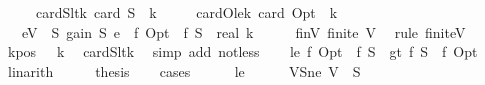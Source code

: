 \begin{isabellebody}
\ \ \ \ \ cardS{\isacharunderscore}{\kern0pt}lt{\isacharunderscore}{\kern0pt}k{\isacharcolon}{\kern0pt}\ {\isachardoublequoteopen}card\ S\ {\isacharless}{\kern0pt}\ k{\isachardoublequoteclose}\isanewline
\ \ \ \ \ cardO{\isacharunderscore}{\kern0pt}le{\isacharunderscore}{\kern0pt}k{\isacharcolon}{\kern0pt}\ {\isachardoublequoteopen}card\ Opt\ {\isasymle}\ k{\isachardoublequoteclose}\isanewline
\ \ \ {\isachardoublequoteopen}{\isasymexists}e{\isasymin}V\ {\isacharminus}{\kern0pt}\ S{\isachardot}{\kern0pt}\ gain\ S\ e\ {\isasymge}\ {\isacharparenleft}{\kern0pt}f\ Opt\ {\isacharminus}{\kern0pt}\ f\ S{\isacharparenright}{\kern0pt}\ {\isacharslash}{\kern0pt}\ real\ k{\isachardoublequoteclose}\isanewline
%
\isadelimproof
%
\endisadelimproof
%
\isatagproof
{}\isamarkupfalse%
\ {\isacharminus}{\kern0pt}\isanewline
\ \ \isamarkupfalse%
\ finV{\isacharcolon}{\kern0pt}\ {\isachardoublequoteopen}finite\ V{\isachardoublequoteclose}\ \isamarkupfalse%
\ {\isacharparenleft}{\kern0pt}rule\ finite{\isacharunderscore}{\kern0pt}V{\isacharparenright}{\kern0pt}\isanewline
\ \ \isamarkupfalse%
\ k{\isacharunderscore}{\kern0pt}pos{\isacharcolon}{\kern0pt}\ {\isachardoublequoteopen}{}\ {\isacharless}{\kern0pt}\ k{\isachardoublequoteclose}\ \isamarkupfalse%
\ cardS{\isacharunderscore}{\kern0pt}lt{\isacharunderscore}{\kern0pt}k\ \isamarkupfalse%
\ {\isacharparenleft}{\kern0pt}simp\ add{\isacharcolon}{\kern0pt}\ not{\isacharunderscore}{\kern0pt}less{\isacharparenright}{\kern0pt}\isanewline
\isanewline
\ \ \isamarkupfalse%
\ {\isacharparenleft}{\kern0pt}le{\isacharparenright}{\kern0pt}\ {\isachardoublequoteopen}f\ Opt\ {\isasymle}\ f\ S{\isachardoublequoteclose}\ {\isacharbar}{\kern0pt}\ {\isacharparenleft}{\kern0pt}gt{\isacharparenright}{\kern0pt}\ {\isachardoublequoteopen}f\ S\ {\isacharless}{\kern0pt}\ f\ Opt{\isachardoublequoteclose}\ \isamarkupfalse%
\ linarith\isanewline
\ \ \isamarkupfalse%
\ \isamarkupfalse%
\ {\isacharquery}{\kern0pt}thesis\isanewline
\ \ \isamarkupfalse%
\ cases\isanewline
\ \ \ \ \isamarkupfalse%
\ le\isanewline
\ \ \ \ \isamarkupfalse%
\ VS{\isacharunderscore}{\kern0pt}ne{\isacharcolon}{\kern0pt}\ {\isachardoublequoteopen}V\ {\isacharminus}{\kern0pt}\ S\ {\isasymnoteq}\ {\isacharbraceleft}{\kern0pt}{\isacharbraceright}{\kern0pt}{\isachardoublequoteclose}\isanewline

\end{isabellebody}
